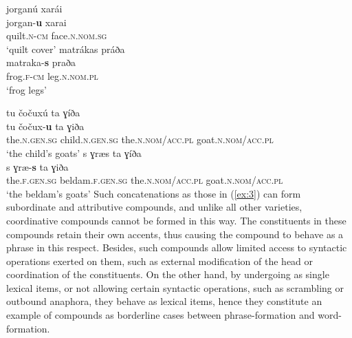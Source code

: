 \documentclass[output=paper]{LSP/langsci}
\begin{document}
 \begin{multicols}{2}
\ea\label{ex:3}
	\ea\label{ex:3a}
		\glll jorganú xarái\\
				jorgan-\textbf{u} xarai\\
				quilt.\textsc{n}-\textsc{cm} face.\textsc{n.nom.sg}\\
		\glt `quilt cover'
	\ex\label{ex:3b}
		\glll matrákas práða\\
				matraka-\textbf{s} praða\\
				frog.\textsc{f}-\textsc{cm} leg.\textsc{n.nom.pl}\\
		\glt `frog legs'
	\z
\z
\end{multicols}
\ea\label{ex:4}
	\ea\label{4a}
		\glll tu čočuxú ta ɣíða\\
				tu čočux-\textbf{u} ta ɣiða\\
				the.\textsc{n.gen.sg} child.\textsc{n.gen.sg} the.\textsc{n.nom/acc.pl} goat.\textsc{n.nom/acc.pl}\\
		\glt `the child's goats'
	\ex\label{4b}
		\glll s ɣr{\ae}s ta ɣíða\\
				s ɣr{\ae}-\textbf{s} ta ɣiða\\
				the.\textsc{f.gen.sg} beldam.\textsc{f.gen.sg} the.\textsc{n.nom/acc.pl} goat.\textsc{n.nom/acc.pl}\\
		\glt `the beldam's goats'
	\z
\z	
Such concatenations as those in (\ref{ex:3}) can form subordinate and attributive compounds, and unlike all other  varieties, coordinative compounds cannot be formed in this way. The constituents in these compounds retain their own accents, thus causing the compound to behave as a  phrase in this respect. Besides, such compounds allow limited access to syntactic operations exerted on them, such as external modification of the head or coordination of the constituents. On the other hand, by undergoing  as single lexical items, or not allowing certain syntactic operations, such as scrambling or outbound anaphora, they behave as lexical items, hence they constitute an example of compounds as borderline cases between phrase-formation and word-formation. 
\end{document}
